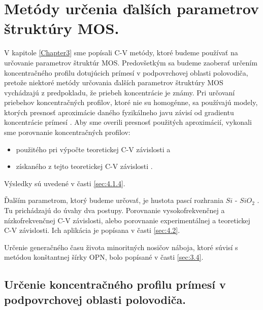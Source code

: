 
\chapter{Metódy určenia ďalších parametrov štruktúry MOS.} %

\label{Chapter4} %



V kapitole \ref{Chapter3} sme popísali C-V metódy, ktoré budeme
používať na určovanie parametrov štruktúr MOS. Predovšetkým sa budeme
zaoberať určením koncentračného profilu dotujúcich prímesí v
podpovrchovej oblasti polovodiča, pretože niektoré metódy určovania
ďalších parametrov štruktúry MOS vychádzajú z predpokladu, že priebeh
koncentrácie je známy. Pri určovaní priebehov koncentračných profilov,
ktoré nie su homogénne, sa používajú modely, ktorých presnosť
aproximácie daného fyzikálneho javu závisí od gradientu koncentrácie
prímesí \cite{4.1, 4.2, 4.3, 4.4}. Aby sme overili presnosť použitých
aproximácií, vykonali sme porovnanie koncentračných profilov:

\begin{itemize}
\item použitého pri výpočte teoretickej C-V závislosti a
\item získaného z tejto teoretickej C-V závislosti \cite{4.5}.
\end{itemize}
Výsledky sú uvedené v časti \ref{sec:4.1.4}.

\par Ďalším parametrom, ktorý budeme určovať, je hustota pascí
rozhrania $Si$ - $SiO_{2}$ . Tu prichádzajú do úvahy dva
postupy. Porovnanie vysokofrekvenčnej a nízkofrekvenčnej C-V
závislosti, alebo porovnanie experimentálnej a teoretickej C-V
závislosti. Ich aplikácia je popísana v časti \ref{sec:4.2}.

\par Určenie generačného času života minoritných nosičov náboja, ktoré
súvisí s metódou konštantnej šírky OPN, bolo popísané v časti
\ref{sec:3.4}.

\section[Určenie koncentračného profilu prímesí]{Určenie koncentračného profilu prímesí v podpovrchovej oblasti polovodiča.}\label{sec:4.1}

